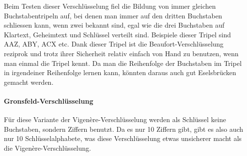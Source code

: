 Beim Testen dieser Verschlüsselung fiel die Bildung von immer gleichen Buchstabentripeln auf, bei denen man immer auf den dritten Buchstaben schliessen kann, wenn zwei bekannt sind, egal wie die drei Buchstaben auf Klartext, Geheimtext und Schlüssel verteilt sind. Beispiele dieser Tripel sind AAZ, ABY, ACX etc. Dank dieser Tripel ist die Beaufort-Verschlüsselung reziprok und trotz ihrer Sicherheit relativ einfach von Hand zu benutzen, wenn man einmal die Tripel kennt. Da man die Reihenfolge der Buchstaben im Tripel in irgendeiner Reihenfolge lernen kann, könnten daraus auch gut Eselsbrücken gemacht werden.

\newpage
\paragraph{Gronsfeld-Verschlüsselung}
\label{sec:v-gronsfeld}
Für diese Variante der Vigenère-Verschlüsselung werden als Schlüssel keine Buchstaben, sondern Ziffern benutzt. Da es nur 10 Ziffern gibt, gibt es also auch nur 10 Schlüsselalphabete, was diese Verschlüsselung etwas unsicherer macht als die Vigenère-Verschlüsselung. \cite{boxentriq:gronsfeld}

